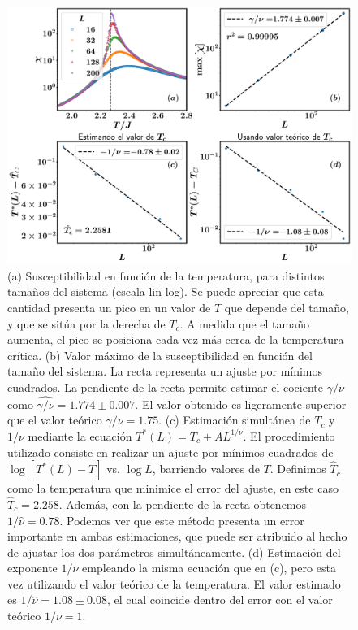 \documentclass[10pt]{article}
\begin{document}
\begin{enumerate}[a)]
\begin{figure}[ht]
\centering
\includegraphics[scale=0.27]{Fig4.pdf}
\caption{(a) Susceptibilidad en función de la temperatura, para distintos tamaños del sistema (escala lin-log). Se puede apreciar que esta cantidad presenta un pico en un valor de $T$ que depende del tamaño, y que se sitúa por la derecha de $T_c$. A medida que el tamaño aumenta, el pico se posiciona cada vez más cerca de la temperatura crítica. (b) Valor máximo de la susceptibilidad en función del tamaño del sistema. La recta representa un ajuste por mínimos cuadrados. La pendiente de la recta permite estimar el cociente $\gamma/\nu$ como $\hat{\gamma/\nu} = 1.774\pm 0.007$. El valor obtenido es ligeramente superior que el valor teórico $\gamma /\nu = 1.75$. (c) Estimación simultánea de $T_c$ y $1/\nu$ mediante la ecuación  $T^*(L) = T_c + A L^{1/\nu}$. El procedimiento utilizado consiste en realizar un ajuste por mínimos cuadrados de $\log [T^*(L) - T]$ vs. $\log L$, barriendo valores de $T$. Definimos $\hat{T}_c$ como la temperatura que minimice el error del ajuste, en este caso $\hat{T}_c = 2.258$. Además, con la pendiente de la recta obtenemos $1/\hat{\nu} = 0.78$. Podemos ver que este método presenta un error importante en ambas estimaciones, que puede ser atribuido al hecho de ajustar los dos parámetros simultáneamente. (d) Estimación del exponente $1/\nu$ empleando la misma ecuación que en (c), pero esta vez utilizando el valor teórico de la temperatura. El valor estimado es $1/\hat{\nu} = 1.08\pm 0.08$, el cual coincide dentro del error con el valor teórico $1/\nu = 1$.}
\end{figure}


\end{enumerate}
\end{document}
